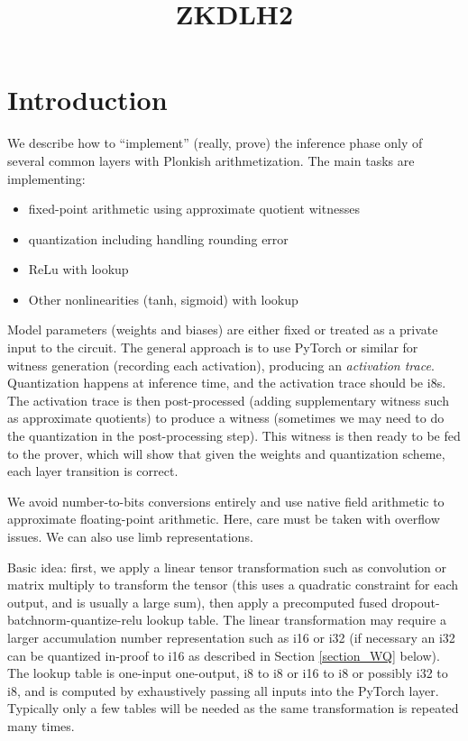 \documentclass[12pt]{amsart}
\title[zkdlh2]{ZKDLH2}
\theoremstyle{plain}
\theoremstyle{definition}
\theoremstyle{definition}
\theoremstyle{definition}
\theoremstyle{definition}
\theoremstyle{definition}
\begin{document}
\begin{abstract} 

\end{abstract}
\maketitle

\section{Introduction}
We describe how to ``implement'' (really, prove) the inference phase only of several common layers with Plonkish arithmetization. The main tasks are implementing:
\begin{itemize}
\item fixed-point arithmetic using approximate quotient witnesses
\item quantization including handling rounding error
\item ReLu with lookup
\item Other nonlinearities (tanh, sigmoid) with lookup
\end{itemize}

Model parameters (weights and biases) are either fixed or treated as a private input to the circuit.  The general approach is to use PyTorch or similar for witness generation (recording each activation), producing an {\em activation trace}.  Quantization happens at inference time, and the activation trace should be i8s. The activation trace is then post-processed (adding supplementary witness such as approximate quotients) to produce a witness (sometimes we may need to do the quantization in the post-processing step).  This witness is then ready to be fed to the prover, which will show that given the weights and quantization scheme, each layer transition is correct. 

We avoid number-to-bits conversions entirely and use native field arithmetic to approximate floating-point arithmetic.  Here, care must be taken with overflow issues.  We can also use limb representations.


Basic idea: first, we apply a linear tensor transformation such as convolution or matrix multiply to transform the tensor (this uses a quadratic constraint for each output, and is usually a large sum), then apply a precomputed fused dropout-batchnorm-quantize-relu lookup table.  The linear transformation may require a larger accumulation number representation such as i16 or i32 (if necessary an i32 can be quantized in-proof to i16 as described in Section \ref{section_WQ} below). The lookup table is one-input one-output, i8 to i8 or i16 to i8 or possibly i32 to i8, and is computed by exhaustively passing all inputs into the PyTorch layer.  Typically only a few tables will be needed as the same transformation is repeated many times.
\end{document}
